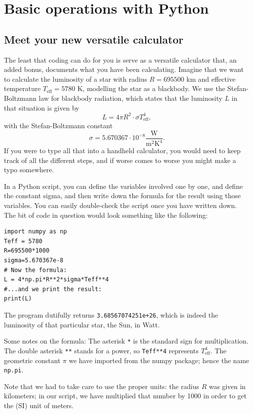 \documentclass[twocolumn,apj]{openjournal}
\newcommand{\be}{\begin{equation}}
\newcommand{\ee}{\end{equation}}
\begin{document}
\section{Basic operations with Python}

\subsection{Meet your new versatile calculator}
\label{BasicCalculations}

The least that coding can do for you is serve as a versatile calculator that, an added bonus, documents what you have been calculating. Imagine that we want to calculate the luminosity of a star with radius $R=695 500$ km and effective temperature $T_{\mathrm{eff}}=5780$ K, modelling the star as a blackbody. We use the Stefan-Boltzmann law for blackbody radiation, which states that the luminosity $L$ in that situation is given by 
\be
L = 4\pi R^2\cdot \sigma T_{\mathrm{eff}}^4,
\label{LuminosityFunc}
\ee
with the Stefan-Boltzmann constant 
$$\sigma=
5.670367\cdot 10^{-8} \frac{\mbox{W}}{\mbox{m}^2\mbox{K}^4}.
$$
If you were to type all that into a handheld calculator, you would need to keep track of all the different steps, and if worse comes to worse you might make a typo somewhere. 

In a Python script, you can define the variables involved one by one, and define the constant sigma, and then write down the formula for the result using those variables. You can easily double-check the script once you have written down. The bit of code in question would look something like the following:
\begin{lstlisting}
import numpy as np
Teff = 5780
R=695500*1000
sigma=5.670367e-8
# Now the formula:
L = 4*np.pi*R**2*sigma*Teff**4
#...and we print the result:
print(L)
\end{lstlisting}
The program dutifully returns \verb|3.68567074251e+26|, which is indeed the luminosity of that particular star, the Sun, in Watt.

Some notes on the formula: The asterisk \verb|*| is the standard sign for multiplication. The double asterisk \verb|**| stands for a power, so \verb|Teff**4| represents $T_{\mathrm{eff}}^4$. The geometric constant $\pi$ we have imported from the numpy package; hence the name \verb|np.pi|.

Note that we had to take care to use the proper units: the radius $R$ was given in kilometers; in our script, we have multiplied that number by 1000 in order to get the (SI) unit of meters. 
\end{document}
